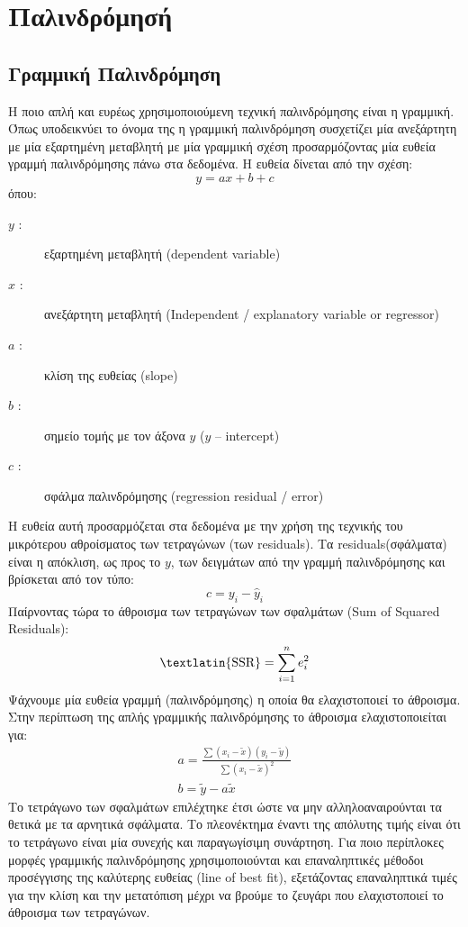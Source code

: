 \newpage
\section{Παλινδρόμησή}

\subsection{Γραμμική Παλινδρόμηση}
Η ποιο απλή και ευρέως χρησιμοποιούμενη τεχνική παλινδρόμησης είναι η γραμμική. Όπως
υποδεικνύει το όνομα της η γραμμική παλινδρόμηση συσχετίζει μία ανεξάρτητη με μία
εξαρτημένη μεταβλητή με μία γραμμική σχέση προσαρμόζοντας μία ευθεία γραμμή
παλινδρόμησης πάνω στα δεδομένα. Η ευθεία δίνεται από την σχέση:
$$y=ax+b+c$$
όπου:
\begin{description}
    \item[$y$ :] εξαρτημένη μεταβλητή (\textlatin{dependent variabl}e)
    \item[$x$ :] ανεξάρτητη μεταβλητή (\textlatin{Independent / explanatory variable or regressor})
    \item[$a$ :] κλίση της ευθείας (\textlatin{slope})
    \item[$b$ :] σημείο τομής με τον άξονα $y$ ($y$ – \textlatin{intercept})
    \item[$c$ :] σφάλμα παλινδρόμησης (\textlatin{regression residual / error})
\end{description}

Η ευθεία αυτή προσαρμόζεται στα δεδομένα με την χρήση της τεχνικής του μικρότερου
αθροίσματος των τετραγώνων (των \textlatin{residuals}). Τα \textlatin{residuals}(σφάλματα) είναι η απόκλιση, ως
προς το $y$, των δειγμάτων από την γραμμή παλινδρόμησης και βρίσκεται από τον τύπο:
$$c=y_i-\widehat{y}_i$$
Παίρνοντας τώρα το άθροισμα των τετραγώνων των σφαλμάτων (\textlatin{Sum of Squared Residuals}):
$$\text{\textlatin{SSR}}=\sum\limits_{i=1}^{n}e_i^2$$
Ψάχνουμε μία ευθεία γραμμή (παλινδρόμησης) η οποία θα ελαχιστοποιεί το άθροισμα. Στην
περίπτωση της απλής γραμμικής παλινδρόμησης το άθροισμα ελαχιστοποιείται για:
\begin{gather*}
    a=\frac{\sum(x_i-\widetilde{x})(y_i-\widetilde{y})}{\sum(x_i-\widetilde{x})^2} \\
    b=\widetilde{y}-a\widetilde{x}
\end{gather*}
Το τετράγωνο των σφαλμάτων επιλέχτηκε έτσι ώστε να μην αλληλοαναιρούνται τα θετικά με
τα αρνητικά σφάλματα. Το πλεονέκτημα έναντι της απόλυτης τιμής είναι ότι το τετράγωνο
είναι μία συνεχής και παραγωγίσιμη συνάρτηση. Για ποιο περίπλοκες μορφές γραμμικής
παλινδρόμησης χρησιμοποιούνται και επαναληπτικές μέθοδοι προσέγγισης της καλύτερης
ευθείας (\textlatin{line of best fit}), εξετάζοντας επαναληπτικά τιμές για την κλίση και την μετατόπιση
μέχρι να βρούμε το ζευγάρι που ελαχιστοποιεί το άθροισμα των τετραγώνων.


